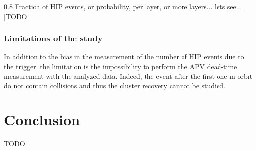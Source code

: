 \begin{table}
\begin{center}
\caption[Table caption text]{The average cluster charge, multiplicity and width and the fraction of clusters larger than 10 strips for four categories defined in Tab.~\ref{tab:eventCategories} for run 273162. The quantities are computed from both on-track and off-track clusters.}
\label{tab:clusterCategories}
\end{center}
\end{table}


                 {0.8}       %
                 {Fraction of HIP events, or probability, per layer, or more layers... lets see... [TODO] } %

\subsubsection{Limitations of the study}
 
In addition to the bias in the measurement of the number of HIP events due to the trigger, the limitation is the impossibility to perform the APV dead-time measurement with the analyzed data. Indeed, the event after the first one in orbit do not contain collisions and thus the cluster recovery cannot be studied. 

\section{Conclusion}
TODO



